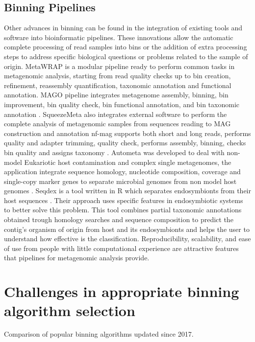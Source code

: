 \documentclass{article}
\begin{document}
\subsection{Binning Pipelines}
Other advances in binning can be found in the integration of existing tools and software into bioinformatic pipelines.
These innovations allow the automatic complete processing of read samples into bins or the addition of extra processing steps to address specific biological questions or problems related to the sample of origin.
MetaWRAP is a modular pipeline ready to perform common tasks in metagenomic analysis, starting from read quality checks up to bin creation, refinement, reassembly quantification, taxonomic annotation and functional annotation.
MAGO pipeline integrates metagenome assembly, binning, bin improvement, bin quality check, bin functional annotation, and bin taxonomic annotation \cite{murovec2019mago}. 
SqueezeMeta also integrates external software to perform the complete analysis of metagenomic samples from sequences reading to \gls{MAG} construction and annotation \cite{tamames2019squeezemeta}
nf-mag supports both short and long reads, performs quality and adapter trimming, quality check,  performs assembly, binning, checks bin quality and assigns taxonomy \cite{ewels2020nf}.
Autometa was developed to deal with non-model Eukariotic host contamination and complex single metagenomes, the application integrate sequence homology, nucleotide composition, coverage and single-copy marker genes to separate microbial genomes from non model host genomes \cite{miller2019autometa}. 
Seqdex is a tool written in R which separates endosymbionts from their host sequences \cite{chiodi2019seqdechi}.
Their approach uses specific features in endosymbiotic systems to better solve this problem.
This tool combines partial taxonomic annotations obtained trough homology searches and sequence composition to predict the contig's organism of origin from host and its endosymbionts and helps the user to understand how effective is the classification.
Reproducibility, scalability, and ease of use from people with little computational experience are attractive features that pipelines for metagenomic analysis provide.

\section{Challenges in appropriate binning algorithm selection}
\begin{table}
\renewcommand{\arraystretch}{1.6}
\begin{tiny}
\centering
\caption[Comparison of popular binning algorithms updated since 2017]{Comparison of popular binning algorithms updated since 2017.}
	
\label{Tbinningsoftware}
\end{tiny}
\end{table}
\end{document}
